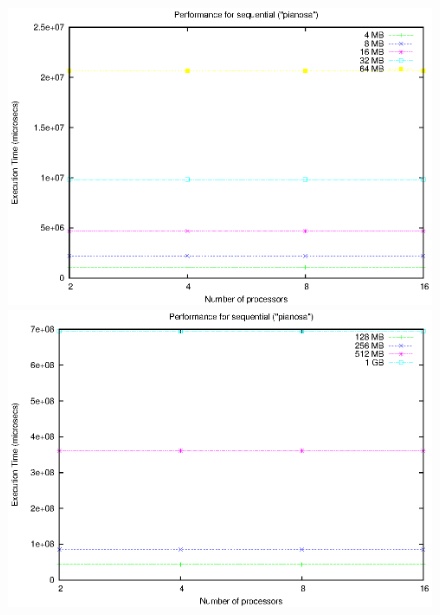 \begin{figure}[t]
    \begin{center}
        \includegraphics[scale=0.6]{plots/test_01_pianosa/NxTxM/sequential_pianosa_NxTxM_small}
    \end{center}
    
    \begin{center}
        \includegraphics[scale=0.6]{plots/test_01_pianosa/NxTxM/sequential_pianosa_NxTxM_large}
    \end{center}
    

\end{figure}
